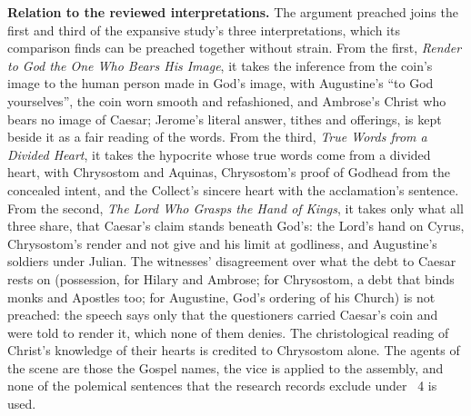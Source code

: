 {\textbf{Relation to the reviewed interpretations.} The argument preached joins
the first and third of the expansive study's three interpretations, which its
comparison finds can be preached together without strain. From the first,
\textit{Render to God the One Who Bears His Image}, it takes the inference
from the coin's image to the human person made in God's image, with
Augustine's ``to God yourselves'', the coin worn smooth and refashioned, and
Ambrose's Christ who bears no image of Caesar; Jerome's literal answer, tithes
and offerings, is kept beside it as a fair reading of the words. From the
third, \textit{True Words from a Divided Heart}, it takes the hypocrite whose
true words come from a divided heart, with Chrysostom and Aquinas, Chrysostom's
proof of Godhead from the concealed intent, and the Collect's sincere heart
with the acclamation's sentence. From the second, \textit{The Lord Who Grasps
the Hand of Kings}, it takes only what all three share, that Caesar's claim
stands beneath God's: the Lord's hand on Cyrus, Chrysostom's render and not
give and his limit at godliness, and Augustine's soldiers under Julian. The
witnesses' disagreement over what the debt to Caesar rests on (possession,
for Hilary and Ambrose; for Chrysostom, a debt that binds monks and Apostles
too; for Augustine, God's ordering of his Church) is not preached: the speech
says only that the questioners carried Caesar's coin and were told to render
it, which none of them denies. The christological reading of Christ's
knowledge of their hearts is credited to Chrysostom alone. The agents of the scene are
those the Gospel names, the vice is applied to the assembly, and none of the
polemical sentences that the research records exclude under ~4 is used.

}
